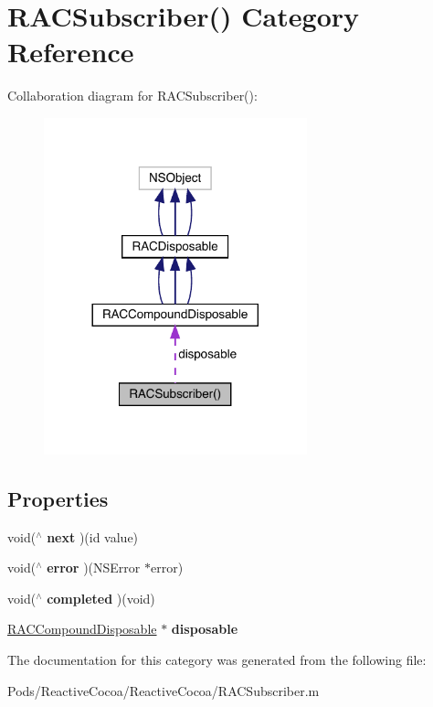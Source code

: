 \hypertarget{category_r_a_c_subscriber_07_08}{}\section{R\+A\+C\+Subscriber() Category Reference}
\label{category_r_a_c_subscriber_07_08}


Collaboration diagram for R\+A\+C\+Subscriber()\+:\nopagebreak
\begin{figure}[H]
\begin{center}
\leavevmode
\includegraphics[width=216pt]{category_r_a_c_subscriber_07_08__coll__graph}
\end{center}
\end{figure}
\subsection*{Properties}
\begin{DoxyCompactItemize}
\item 
\mbox{\label{category_r_a_c_subscriber_07_08_a34733b0b20d983605f9cd537184df9a7}} 
void($^\wedge$ {\bfseries next} )(id value)
\item 
\mbox{\label{category_r_a_c_subscriber_07_08_aeccea25149fdc2d56a8282503442b11f}} 
void($^\wedge$ {\bfseries error} )(N\+S\+Error $\ast$error)
\item 
\mbox{\label{category_r_a_c_subscriber_07_08_a482c2dd76860dc53ed1d33769196bf15}} 
void($^\wedge$ {\bfseries completed} )(void)
\item 
\mbox{\label{category_r_a_c_subscriber_07_08_a21d09580362da40734f347ec18cd2bd3}} 
\mbox{\hyperlink{interface_r_a_c_compound_disposable}{R\+A\+C\+Compound\+Disposable}} $\ast$ {\bfseries disposable}
\end{DoxyCompactItemize}


The documentation for this category was generated from the following file\+:\begin{DoxyCompactItemize}
\item 
Pods/\+Reactive\+Cocoa/\+Reactive\+Cocoa/R\+A\+C\+Subscriber.\+m\end{DoxyCompactItemize}
